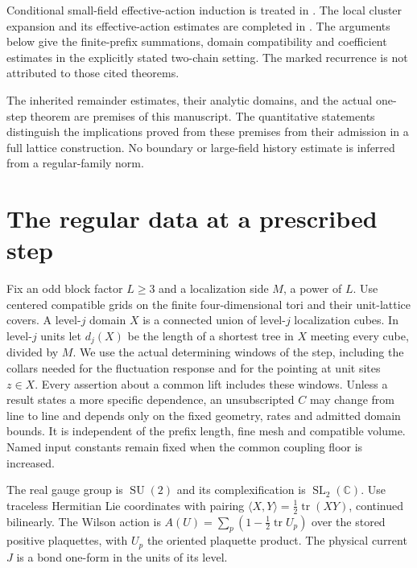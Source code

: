 \documentclass[11pt,letterpaper,reqno]{amsart}
\numberwithin{equation}{section}
\theoremstyle{definition}
\theoremstyle{remark}
\begin{document}
Conditional small-field effective-action induction is treated in
\cite[Theorems~1 and~3, pp.~259 and~264; hypotheses on pp.~260--264]{Bal87}.
The local cluster expansion and its effective-action estimates are
completed in \cite[\S2, pp.~11--22]{Bal88c}.
The arguments below give the finite-prefix summations, domain
compatibility and coefficient estimates in the explicitly stated
two-chain setting. The marked recurrence is not attributed to
those cited theorems.

The inherited remainder estimates, their analytic domains, and the
actual one-step theorem are premises of this manuscript. The
quantitative statements distinguish the implications proved from
these premises from their admission in a full lattice construction.
No boundary or large-field history estimate is inferred from a
regular-family norm.

\section{The regular data at a prescribed step}
\label{em:sec-regular-data}

Fix an odd block factor $L\ge3$ and a localization side $M$, a power of
$L$. Use centered compatible grids on the finite four-dimensional tori
and their unit-lattice covers. A level-$j$ domain $X$ is a connected union
of level-$j$ localization cubes. In level-$j$ units let $d_j(X)$ be the
length of a shortest tree in $X$ meeting every cube, divided by $M$.
We use the actual determining windows of the step, including the collars
needed for the fluctuation response and for the pointing at unit sites
$z\in X$. Every assertion about a common lift includes these windows.
Unless a result states a more specific dependence, an unsubscripted
$C$ may change from line to line and depends only on the fixed
geometry, rates and admitted domain bounds. It is independent of
the prefix length, fine mesh and compatible volume. Named input
constants remain fixed when the common coupling floor is increased.

The real gauge group is $\operatorname{SU}(2)$ and its complexification
is $\operatorname{SL}_2(\mathbb C)$. Use traceless Hermitian Lie
coordinates with pairing $\langle X,Y\rangle=\tfrac12\operatorname{tr}(XY)$,
continued bilinearly. The Wilson action is
$A(U)=\sum_p(1-\tfrac12\operatorname{tr}U_p)$ over the stored positive
plaquettes, with $U_p$ the oriented plaquette product. The physical
current $J$ is a bond one-form in the units of its level.
\end{document}
